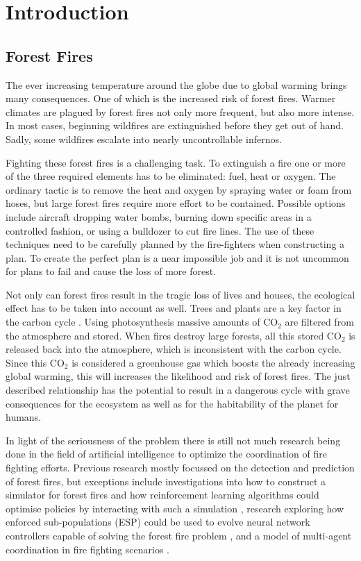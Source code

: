 
\section{Introduction}\label{sec:introduction}

\subsection{Forest Fires}
The ever increasing temperature around the globe due to global warming brings many consequences. One of which is the increased risk of forest fires. Warmer climates are plagued by forest fires not only more frequent, but also more intense.  In most cases, beginning wildfires are extinguished before they get out of hand. Sadly, some wildfires escalate into nearly uncontrollable infernos.

Fighting these forest fires is a challenging task. To extinguish a fire one or more of the three required elements has to be eliminated: fuel, heat or oxygen. The ordinary tactic is to remove the heat and oxygen by spraying water or foam from hoses, but large forest fires require more effort to be contained. Possible options include aircraft dropping water bombs, burning down specific areas in a controlled fashion, or using a bulldozer to cut fire lines. The use of these techniques need to be carefully planned by the fire-fighters when constructing a plan. To create the perfect plan is a near impossible job and it is not uncommon for plans to fail and cause the loss of more forest.

Not only can forest fires result in the tragic loss of lives and houses, the ecological effect has to be taken into account as well. Trees and plants are a key factor in the carbon cycle \citep{kasischke1995fire}. Using photosynthesis massive amounts of CO$_{2}$ are filtered from the atmosphere and stored. When fires destroy large forests, all this stored CO$_{2}$ is released back into the atmosphere, which is inconsistent with the carbon cycle. Since this CO$_{2}$ is considered a greenhouse gas \citep{houghton1991climate} which boosts the already increasing global warming, this will increases the likelihood and risk of forest fires. The just described relationship has the potential to result in a dangerous cycle with grave consequences for the ecosystem as well as for the habitability of the planet for humans.

In light of the seriousness of the problem there is still not much research being done in the field of artificial intelligence to optimize the coordination of fire fighting efforts. Previous research mostly focussed on the detection and prediction of forest fires, but exceptions include investigations into how to construct a simulator for forest fires and how reinforcement learning algorithms could optimise policies by interacting with such a simulation \citep{wiering1998learning}, research exploring how enforced sub-populations (ESP) could be used to evolve neural network controllers capable of solving the forest fire problem \citep{wiering2005evolving}, and a model of multi-agent coordination in fire fighting scenarios \citep{moura2007fighting}.

